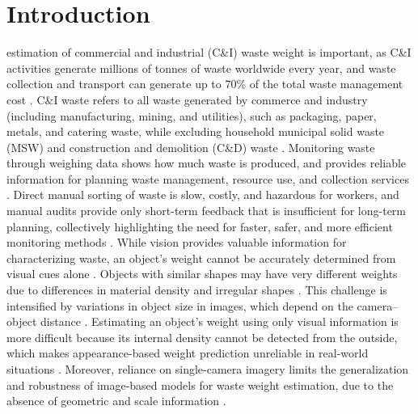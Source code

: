 \documentclass[journal,twoside,web]{ieeecolor}
\begin{document}
\section{Introduction}
 estimation of commercial and industrial (C\&I) waste weight is important, as C\&I activities generate millions of tonnes of waste worldwide every year, and waste collection and transport can generate up to 70\% of the total waste management cost \cite{krishnan2021current, boskovic2016calculating}. C\&I waste refers to all waste generated by commerce and industry (including manufacturing, mining, and utilities), such as packaging, paper, metals, and catering waste, while excluding household municipal solid waste (MSW) and construction and demolition (C\&D) waste \cite{woodard2021waste, lupa2011use}. Monitoring waste through weighing data shows how much waste is produced, and provides reliable information for planning waste management, resource use, and collection services \cite{korhonen2015waste}. Direct manual sorting of waste is slow, costly, and hazardous for workers, and manual audits provide only short-term feedback that is insufficient for long-term planning, collectively highlighting the need for faster, safer, and more efficient monitoring methods \cite{wagland2012development, martinez2022vision, koskinopoulou2021robotic, chen2021looking}. While vision provides valuable information for characterizing waste, an object’s weight cannot be accurately determined from visual cues alone \cite{navarro2023visuo}. Objects with similar shapes may have very different weights due to differences in material density and irregular shapes \cite{diaz2022simultaneous}. This challenge is intensified by variations in object size in images, which depend on the camera–object distance \cite{wang2025image2mass++}. Estimating an object’s weight using only visual information is more difficult because its internal density cannot be detected from the outside, which makes appearance-based weight prediction unreliable in real-world situations \cite{mavrakis2020estimation}. Moreover, reliance on single-camera imagery limits the generalization and robustness of image-based models for waste weight estimation, due to the absence of geometric and scale information \cite{wang2025image2mass++}.
\end{document}

